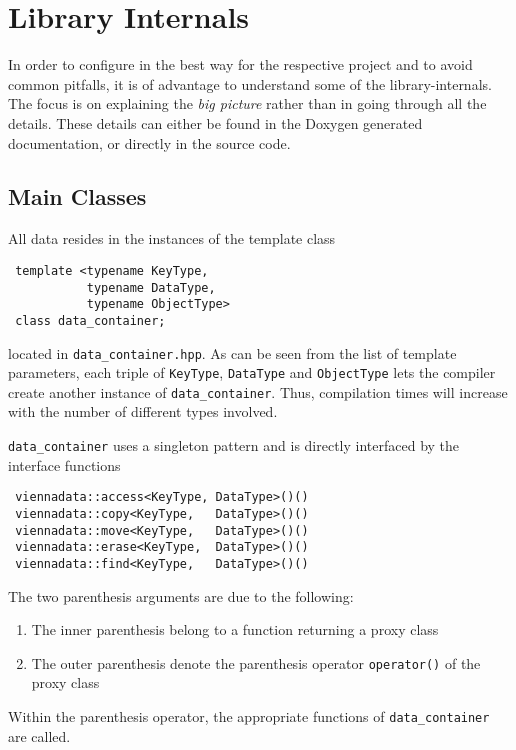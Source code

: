 \chapter{Library Internals} \label{chap:internals}
In order to configure {\ViennaData} in the best way for the respective project and to avoid common pitfalls,
it is of advantage to understand some of the library-internals.
The focus is on explaining the \emph{big picture} rather than in going through all the details.
These details can either be found in the Doxygen generated documentation, or directly in the source code.

\section{Main Classes}
All data resides in the instances of the template class
\begin{lstlisting}
 template <typename KeyType,
           typename DataType,
           typename ObjectType>
 class data_container;
\end{lstlisting}
located in \lstinline|data_container.hpp|.
As can be seen from the list of template parameters, each triple of \lstinline|KeyType|, \lstinline|DataType| and \lstinline|ObjectType| lets
the compiler create another instance of \lstinline|data_container|. Thus, compilation times will increase with the number of different types involved.

\lstinline|data_container| uses a singleton pattern and is directly interfaced by the interface functions
\begin{lstlisting}
 viennadata::access<KeyType, DataType>()()
 viennadata::copy<KeyType,   DataType>()()
 viennadata::move<KeyType,   DataType>()()
 viennadata::erase<KeyType,  DataType>()()
 viennadata::find<KeyType,   DataType>()()
\end{lstlisting}
The two parenthesis arguments are due to the following:
\begin{enumerate}
 \item The inner parenthesis belong to a function returning a proxy class
 \item The outer parenthesis denote the parenthesis operator \lstinline|operator()| of the proxy class
\end{enumerate}
Within the parenthesis operator, the appropriate functions of \lstinline|data_container| are called.

